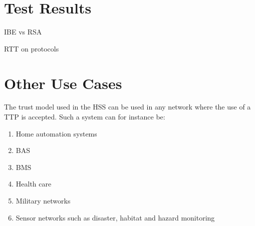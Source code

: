 \section{Test Results}
IBE vs RSA

RTT on protocols



\section{Other Use Cases}
The trust model used in the \gls{HSS} can be used in any network where the use of a \gls{TTP} is accepted. 
Such a system can for instance be:
\begin{enumerate}
	\item Home automation systems
	\item \gls{BAS}
	\item \gls{BMS}
	\item Health care
	\item Military networks
	\item Sensor networks such as disaster, habitat and hazard monitoring
\end{enumerate}


